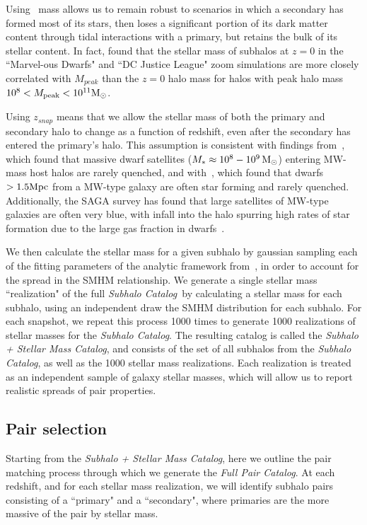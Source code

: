 \documentclass[twocolumn]{aastex631}
\newcommand{\subcat}{\textit{Subhalo Catalog}}
\newcommand{\starcat}{\textit{Subhalo + Stellar Mass Catalog}}
\newcommand{\paircat}{\textit{Full Pair Catalog}}
\begin{document}
    Using \Mpeak\ mass allows us to remain robust to scenarios in which a secondary has formed most of its stars, then loses a significant portion of its dark matter content through tidal interactions with a primary, but retains the bulk of its stellar content.
    In fact, \citet{Munshi2021} found that the stellar mass of subhalos at $z=0$ in the ``Marvel-ous Dwarfs" and ``DC Justice League" zoom simulations are more closely correlated with $M_{peak}$ than the $z=0$ halo mass for halos with peak halo mass $10^8<M_{\rm peak}<10^{11} \mathrm{M}_\odot$. 

    Using $z_{snap}$ means that we allow the stellar mass of both the primary and secondary halo to change as a function of redshift, even after the secondary has entered the primary's halo. 
    This assumption is consistent with findings from~\cite{Akins2021}, which found that massive dwarf satellites ($M_*\approx 10^8-10^9\, \mathrm{M}_\odot$) entering MW-mass host halos are rarely quenched, and with~\cite{Geha2013}, which found that dwarfs $>1.5\mathrm{Mpc}$ from a MW-type galaxy are often star forming and rarely quenched.
    Additionally, the SAGA survey has found that large satellites of MW-type galaxies are often very blue, with infall into the halo spurring high rates of star formation due to the large gas fraction in dwarfs~\citep{Mao2021}. 

    We then calculate the stellar mass for a given subhalo by gaussian sampling each of the fitting parameters of the analytic framework from~\cite{Moster2013}, in order to account for the spread in the SMHM relationship.
    We generate a single stellar mass ``realization" of the full \subcat\ by calculating a stellar mass for each subhalo, using an independent draw the SMHM distribution for each subhalo. 
    For each snapshot, we repeat this process 1000 times to generate 1000 realizations of stellar masses for the \subcat.
    The resulting catalog is called the \starcat, and consists of the set of all subhalos from the \subcat, as well as the 1000 stellar mass realizations. 
    Each realization is treated as an independent sample of galaxy stellar masses, which will allow us to report realistic spreads of pair properties.


    \subsection{Pair selection}\label{sec:methods-pairs}
    Starting from the \starcat, here we outline the pair matching process through which we generate the \paircat. 
    At each redshift, and for each stellar mass realization, we will identify subhalo pairs consisting of a ``primary" and a ``secondary", where primaries are the more massive of the pair by stellar mass.
\end{document}
